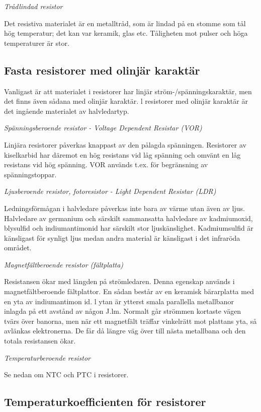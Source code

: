 \emph{Trådlindad resistor}

Det resistiva materialet är en metalltråd,
som är lindad på en stomme som tål hög
temperatur; det kan var keramik, glas etc.
Tåligheten mot pulser och höga temperaturer är stor.

\subsection{Fasta resistorer med olinjär karaktär}

Vanligast är att materialet i resistorer har
linjär ström-/spänningskaraktär, men det
finns även sådana med olinjär karaktär. l
resistorer med olinjär karaktär är det ingående materialet av halvledartyp.

\emph{Spänningsberoende resistor - Voltage Dependent Resistar (VOR)}

Linjära resistorer påverkas knappast av den
pålagda spänningen. Resistorer av kiselkarbid har däremot en hög resistans vid låg
spänning och omvänt en låg resistans vid
hög spänning. VOR används t.ex. för begränsning av spänningstoppar.

\emph{Ljusberoende resistor, fotoresistor - Light Dependent Resistar (LDR)}

Ledningsförmågan i halvledare påverkas inte
bara av värme utan även av ljus. Halvledare
av germanium och särskilt sammansatta
halvledare av kadmiumoxid, blysulfid och
indiumantimonid har särskilt stor ljuskänslighet. Kadmiumsulfid är känsligast
för synligt ljus medan andra material är känsligast i
det infraröda området.

\emph{Magnetfältberoende resistor (fältplatta)}

Resistansen ökar med längden på strömledaren. Denna egenskap används i
magnetfältberoende fältplattor. En sådan består
av en keramisk bärarplatta med en yta av
indiumantimon id. l ytan är ytterst smala parallella metallbanor inlagda på ett avstånd av
någon J.lm. Normalt går strömmen kortaste
vägen tvärs över banorna, men när ett magnetfält träffar vinkelrätt mot plattans yta, så
avlänkas elektronerna. De får då längre väg
över till nästa metallbana och den totala
resistansen ökar.

\emph{Temperaturberoende resistor}

Se nedan om NTC och PTC i resistorer.

\subsection{Temperaturkoefficienten för resistorer}

